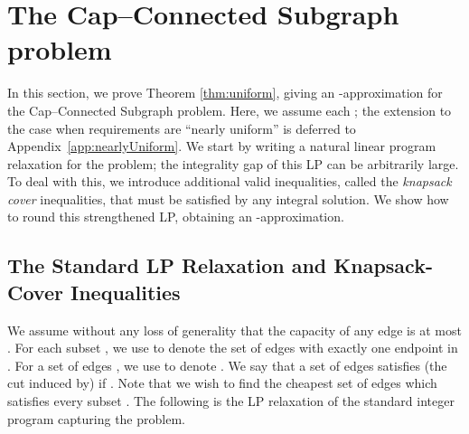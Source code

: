 \documentclass[11pt]{article}
\newcounter{thm0Rcopies}
\newcounter{thm_saved}
\def\capR{Cap--Connected Subgraph\xspace}
\begin{document}
\iffalse
The Cap-SNDP, and the FCNF problem described above are related to the
buy-at-bulk network design problem which has been extensively studied
in the literature. In the latter, there are demands  among
pairs of vertices, and each edge has a concave, increasing function
 associated with it. The goal is to simultaneously route flow of
value  for each of these pairs, such that  is minimized, where  is the flow on edge . In
particular, the function  could be . Note that edges do not have capacities upper bounding the total
flow through it, and this key difference makes the buy-at-bulk problem
tractable. In undirected graphs, when all positive demand pairs share
a common vertex, there is a  algorithm known for the
problem \cite{MMP}, and for the general case, a  algorithm
is known \cite{CHKS}. The hardness of approximation for the single
source and the general case are  \cite{CGNS} and
 \cite{And}, respectively.
\fi



\section{The \capR problem}
\label{sec:uniformReq}

In this section, we prove Theorem \ref{thm:uniform}, giving an -approximation for the \capR problem. Here, we assume each ; the extension to the case when requirements are ``nearly
uniform'' is deferred to Appendix~\ref{app:nearlyUniform}.  We start
by writing a natural linear program relaxation for the problem; the
integrality gap of this LP can be arbitrarily large. To deal with
this, we introduce additional valid inequalities, called the
\emph{knapsack cover} inequalities, that must be satisfied by any
integral solution. We show how to round this strengthened LP,
obtaining an -approximation.


\subsection{The Standard LP Relaxation and Knapsack-Cover  Inequalities}


We assume without any loss of generality that the capacity of
any edge is at most .
For each subset , we use  to denote the
set of edges with exactly one endpoint in . For a set of edges ,
we use  to denote . We say that a set of
edges  satisfies (the cut induced by)  if . Note that we wish to find the cheapest set of edges which
satisfies every subset . The following is
the LP relaxation of the standard integer program capturing the
problem.  \vspace{-5mm}
\end{document}

